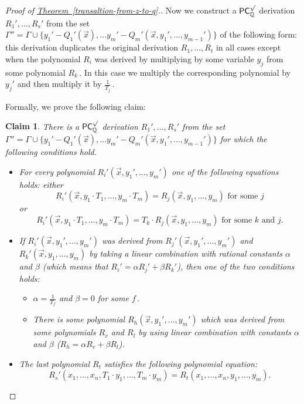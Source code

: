 \documentclass[11pt]{article}
\newcommand{\expref}[2]{\texorpdfstring{\hyperref[#2]{#1~\ref{#2}}}{#1~\ref{#2}}}
\newtheorem{claim}[theorem]{Claim}
\newcommand{\Q}{{\mathbb Q}}
\begin{document}
\begin{proof}[Proof of \expref{Theorem}{transaltion-from-z-to-q}.]
Now we construct a $\mathsf{PC}_{\Q}^{\surd}$ derivation %
$R_1', \ldots, R_s'$ %
 from the set $\Gamma'' = \Gamma \cup \{y_1' - Q_1'(\vec x), \ldots y_m' - Q_m'(\vec x, y_1', \ldots, y_{m - 1}')\}$ of the following form: this derivation duplicates the original derivation %
$R_1, \ldots, R_t$ %
 in all cases except when the polynomial $R_i$ was derived by multiplying by some variable $y_j$ from some polynomial %
$R_k\,.$ %
 In this case we multiply the corresponding polynomial by $y_j'$ and then multiply it by %
$\frac{1}{T_j}\,.$ %

Formally, we prove the following claim:
\begin{claim}\label{cla:Q-Z trans}
%
  There is a $\mathsf{PC}_{\Q}^{\surd}$ derivation %
$R_1', \ldots, R_s'$ %
 from the set \\ $\Gamma'' = \Gamma \cup \{y_1' - Q_1'(\vec x), \ldots y_m' - Q_m'(\vec x, y_1', \ldots, y_{m - 1}')\}$ for which the following
%
conditions hold.  %
\begin{itemize}
    \item For every polynomial $R_i'(\vec x, y_1', \ldots, y_m')$ one of the following equations holds:
    	either 
	$$
	R_i'(\vec x, y_1 \cdot T_1, \ldots, y_m \cdot T_m) = R_j(\vec x, y_1, \ldots, y_m) \text{ for some } j
	$$ 
	or 
	$$
	R_i'(\vec x, y_1 \cdot T_1, \ldots, y_m \cdot T_m) =  T_k \cdot R_j(\vec x, y_1, \ldots, y_m) \text{ for some } k \text{ and } j.
	$$ 
    \item If $R_i'(\vec x, y_1', \ldots, y_m')$ was derived from $R_j'(\vec x, y_1', \ldots, y_m')$ and $R_k'(\vec x, y_1, \ldots, y_m)$ by taking a linear combination with rational constants $\alpha$ and $\beta$ (which means that $R_i' = \alpha R_j' + \beta R_k'$), then one of the two conditions holds: 
	\begin{itemize}
	\item $\alpha = \frac{1}{T_f}$ and $\beta = 0$ for some %
$f\,.$ %
	\item There is some polynomial $R_h(\vec x, y_1', \ldots, y_m')$ which was derived from some polynomials $R_v$ and $R_l$ by using linear combination with constants $\alpha$ and $\beta$ ($R_h = \alpha R_v + \beta R_l$).
	\end{itemize}
%
    \item The last polynomial $R_t$ satisfies the following polynomial equation: %
    $$
    R_s'(x_1, \ldots, x_n, T_1 \cdot y_1, \ldots, T_m \cdot y_m) = R_t(x_1, \ldots, x_n, y_1, \ldots, y_m).
    $$
\end{itemize}


\end{claim}
\end{proof}
\end{document}
